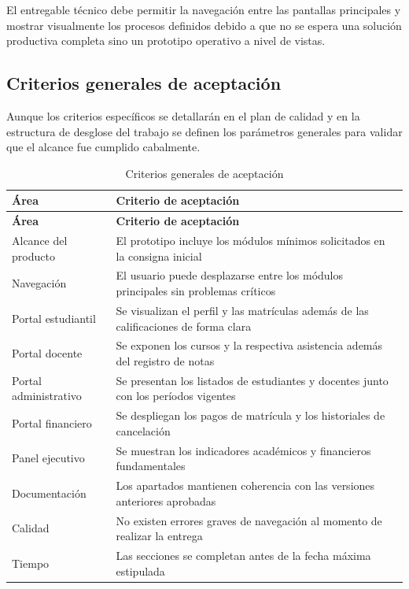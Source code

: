 \documentclass[11pt,spanish]{article}
\begin{document}
El entregable técnico debe permitir la navegación entre las pantallas principales y mostrar visualmente los procesos definidos debido a que no se espera una solución productiva completa sino un prototipo operativo a nivel de vistas.

\subsection{Criterios generales de aceptación}

Aunque los criterios específicos se detallarán en el plan de calidad y en la estructura de desglose del trabajo se definen los parámetros generales para validar que el alcance fue cumplido cabalmente.

\begin{longtable}{L{4.6cm} L{9.8cm}}
\caption{Criterios generales de aceptación}\label{tab:criterios-aceptacion}\\[-0.5em]
\toprule
\textbf{Área} & \textbf{Criterio de aceptación} \\
\midrule
\endfirsthead
\toprule
\textbf{Área} & \textbf{Criterio de aceptación} \\
\midrule
\endhead
Alcance del producto & El prototipo incluye los módulos mínimos solicitados en la consigna inicial \\
Navegación & El usuario puede desplazarse entre los módulos principales sin problemas críticos \\
Portal estudiantil & Se visualizan el perfil y las matrículas además de las calificaciones de forma clara \\
Portal docente & Se exponen los cursos y la respectiva asistencia además del registro de notas \\
Portal administrativo & Se presentan los listados de estudiantes y docentes junto con los períodos vigentes \\
Portal financiero & Se despliegan los pagos de matrícula y los historiales de cancelación \\
Panel ejecutivo & Se muestran los indicadores académicos y financieros fundamentales \\
Documentación & Los apartados mantienen coherencia con las versiones anteriores aprobadas \\
Calidad & No existen errores graves de navegación al momento de realizar la entrega \\
Tiempo & Las secciones se completan antes de la fecha máxima estipulada \\
\bottomrule
\end{longtable}
\end{document}

